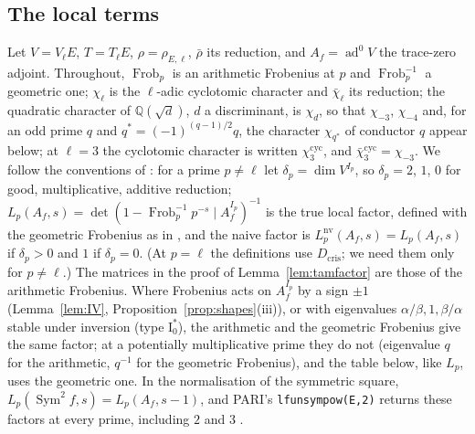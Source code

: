 \documentclass[11pt]{amsart}
\theoremstyle{definition}
\newcommand{\Q}{\mathbb{Q}}
\newcommand{\ad}{\operatorname{ad}^0}
\newcommand{\Sym}{\operatorname{Sym}^2}
\newcommand{\nv}{\mathrm{nv}}
\newcommand{\Frob}{\operatorname{Frob}}
\newcommand{\cyc}{\mathrm{cyc}}
\begin{document}
\subsection{The local terms}\label{sec:localterms}
Let $V=V_\ell E$, $T=T_\ell E$, $\rho=\rho_{E,\ell}$, $\bar\rho$ its reduction, and $A_f=\ad V$ the trace-zero adjoint. Throughout, $\Frob_p$ is an arithmetic Frobenius at $p$ and $\Frob_p^{-1}$ a geometric one; $\chi_\ell$ is the $\ell$-adic cyclotomic character and $\bar\chi_\ell$ its reduction; the quadratic character of $\Q(\sqrt d)$, $d$ a discriminant, is $\chi_d$, so that $\chi_{-3}$, $\chi_{-4}$ and, for an odd prime $q$ and $q^*=(-1)^{(q-1)/2}q$, the character $\chi_{q^*}$ of conductor $q$ appear below; at $\ell=3$ the cyclotomic character is written $\chi_3^{\cyc}$, and $\bar\chi_3^{\cyc}=\chi_{-3}$. We follow the conventions of \cite[\S1.7.2]{DFG04}: for a prime $p\ne\ell$ let $\delta_p=\dim V^{I_p}$, so $\delta_p=2$, $1$, $0$ for good, multiplicative, additive reduction; $L_p(A_f,s)=\det(1-\Frob_p^{-1}p^{-s}\mid A_f^{I_p})^{-1}$ is the true local factor, defined with the geometric Frobenius as in \cite[\S1.1.1]{DFG04}, and the naive factor is $L_p^{\nv}(A_f,s)=L_p(A_f,s)$ if $\delta_p>0$ and $1$ if $\delta_p=0$. (At $p=\ell$ the definitions use $D_{\mathrm{cris}}$; we need them only for $p\ne\ell$.) The matrices in the proof of Lemma~\ref{lem:tamfactor} are those of the arithmetic Frobenius. Where Frobenius acts on $A_f^{I_p}$ by a sign $\pm1$ (Lemma~\ref{lem:IV}, Proposition~\ref{prop:shapes}(iii)), or with eigenvalues $\alpha/\beta,1,\beta/\alpha$ stable under inversion (type $\mathrm{I}_0^*$), the arithmetic and the geometric Frobenius give the same factor; at a potentially multiplicative prime they do not (eigenvalue $q$ for the arithmetic, $q^{-1}$ for the geometric Frobenius), and the table below, like $L_p$, uses the geometric one. In the normalisation of the symmetric square, $L_p(\Sym f,s)=L_p(A_f,s-1)$, and PARI's \texttt{lfunsympow(E,2)} returns these factors at every prime, including $2$ and $3$ \cite{PARI}.
\end{document}
